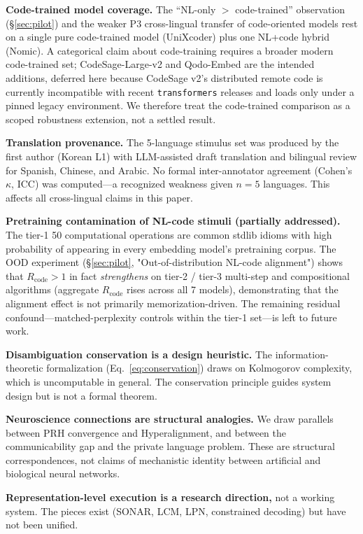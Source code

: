 \documentclass[11pt]{article}
\theoremstyle{definition}
\begin{document}
\textbf{Code-trained model coverage.} The ``NL-only $>$ code-trained'' observation (\S\ref{sec:pilot}) and the weaker P3 cross-lingual transfer of code-oriented models rest on a single pure code-trained model (UniXcoder) plus one NL+code hybrid (Nomic). A categorical claim about code-training requires a broader modern code-trained set; CodeSage-Large-v2 and Qodo-Embed are the intended additions, deferred here because CodeSage v2's distributed remote code is currently incompatible with recent \texttt{transformers} releases and loads only under a pinned legacy environment. We therefore treat the code-trained comparison as a scoped robustness extension, not a settled result.

\textbf{Translation provenance.} The 5-language stimulus set was produced by the first author (Korean L1) with LLM-assisted draft translation and bilingual review for Spanish, Chinese, and Arabic. No formal inter-annotator agreement (Cohen's $\kappa$, ICC) was computed---a recognized weakness given $n=5$ languages. This affects all cross-lingual claims in this paper.

\textbf{Pretraining contamination of NL-code stimuli (partially addressed).} The tier-1 50 computational operations are common stdlib idioms with high probability of appearing in every embedding model's pretraining corpus. The OOD experiment (\S\ref{sec:pilot}, "Out-of-distribution NL-code alignment") shows that $R_{\text{code}} > 1$ in fact \emph{strengthens} on tier-2 / tier-3 multi-step and compositional algorithms (aggregate $R_{\text{code}}$ rises across all 7 models), demonstrating that the alignment effect is not primarily memorization-driven. The remaining residual confound---matched-perplexity controls within the tier-1 set---is left to future work.

\textbf{Disambiguation conservation is a design heuristic.} The information-theoretic formalization (Eq.~\ref{eq:conservation}) draws on Kolmogorov complexity, which is uncomputable in general. The conservation principle guides system design but is not a formal theorem.

\textbf{Neuroscience connections are structural analogies.} We draw parallels between PRH convergence and Hyperalignment, and between the communicability gap and the private language problem. These are structural correspondences, not claims of mechanistic identity between artificial and biological neural networks.

\textbf{Representation-level execution is a research direction,} not a working system. The pieces exist (SONAR, LCM, LPN, constrained decoding) but have not been unified.
\end{document}
